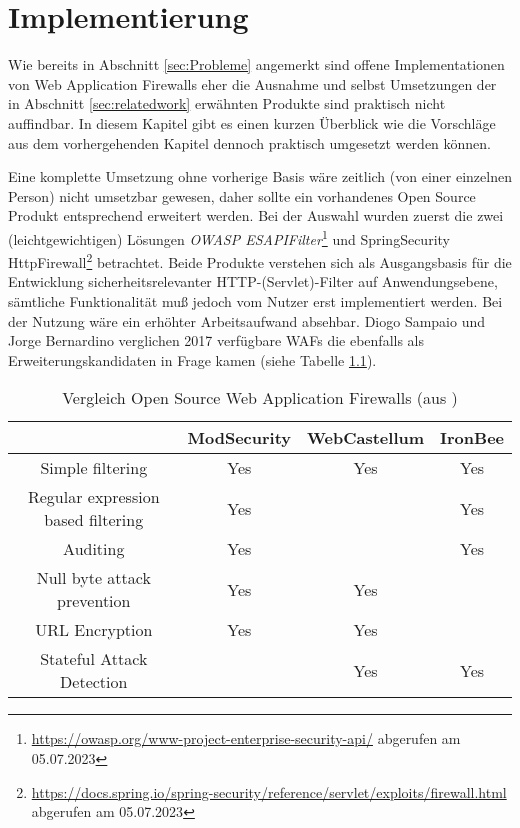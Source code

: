 \chapter{Implementierung}



Wie bereits in Abschnitt \ref{sec:Probleme} angemerkt sind offene Implementationen von Web Application Firewalls eher die Ausnahme und selbst Umsetzungen der in Abschnitt \ref{sec:relatedwork} erwähnten Produkte sind praktisch nicht auffindbar. In diesem Kapitel gibt es einen kurzen Überblick wie die Vorschläge aus dem vorhergehenden Kapitel dennoch praktisch umgesetzt werden können.

Eine komplette Umsetzung ohne vorherige Basis wäre zeitlich (von einer einzelnen Person) nicht umsetzbar gewesen, daher sollte ein vorhandenes Open Source Produkt entsprechend erweitert werden. Bei der Auswahl wurden zuerst die zwei (leichtgewichtigen) Lösungen \emph{OWASP ESAPIFilter}\footnote{\url{https://owasp.org/www-project-enterprise-security-api/} abgerufen am 05.07.2023} und {SpringSecurity HttpFirewall}\footnote{\url{https://docs.spring.io/spring-security/reference/servlet/exploits/firewall.html} abgerufen am 05.07.2023} betrachtet. Beide Produkte verstehen sich als Ausgangsbasis für die Entwicklung sicherheitsrelevanter HTTP-(Servlet)-Filter auf Anwendungsebene, sämtliche Funktionalität muß jedoch vom Nutzer erst implementiert werden. Bei der Nutzung wäre ein erhöhter Arbeitsaufwand absehbar. Diogo Sampaio und Jorge Bernardino verglichen 2017 verfügbare WAFs die ebenfalls als Erweiterungskandidaten in Frage kamen (siehe Tabelle \ref{tab:my_vergos}).


\begin{table}[h]
  \centering
  \begin{tabular}{cccc} 
    \toprule
    & \textbf{ModSecurity} & \textbf{WebCastellum} & \textbf{IronBee} \\ [0.5ex] 
    \midrule
    Simple filtering & Yes & Yes & Yes \\ 
    Regular expression based filtering & Yes &  & Yes \\
    Auditing & Yes &  & Yes \\
    Null byte attack prevention & Yes & Yes &  \\
    URL Encryption & Yes & Yes &  \\ [1ex] 
    Stateful Attack Detection & & Yes & Yes \\
    \bottomrule
  \end{tabular}
  \caption{Vergleich Open Source Web Application Firewalls (aus \cite{Sampaio2017}) }
  \label{tab:my_vergos}
\end{table}

